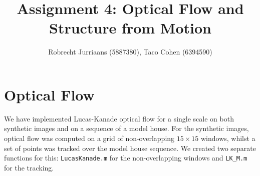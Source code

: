 \documentclass[a4paper,10pt]{article}
\title{Assignment 4: Optical Flow and Structure from Motion}
\author{Robrecht Jurriaans (5887380), Taco Cohen (6394590)}
\begin{document}
\maketitle

\section{Optical Flow}

We have implemented Lucas-Kanade optical flow for a single scale on both synthetic images and on a sequence of a model house. For the synthetic images, optical flow was computed on a grid of non-overlapping $15\times15$ windows, whilst a set of points was tracked over the model house sequence. We created two separate functions for this: \verb|LucasKanade.m| for the non-overlapping windows and \verb|LK_M.m| for the tracking. 
\end{document}
